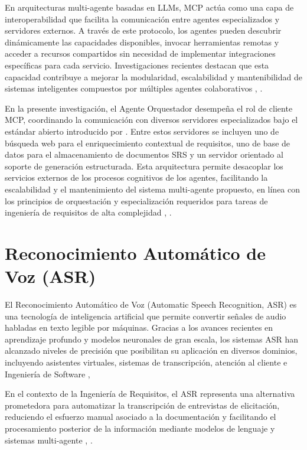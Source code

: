 En arquitecturas multi-agente basadas en LLMs, MCP actúa como una capa de interoperabilidad que facilita la comunicación entre agentes 
especializados y servidores externos. A través de este protocolo, los agentes pueden descubrir dinámicamente las capacidades disponibles, 
invocar herramientas remotas y acceder a recursos compartidos sin necesidad de implementar integraciones específicas para cada servicio. 
Investigaciones recientes destacan que esta capacidad contribuye a mejorar la modularidad, escalabilidad y mantenibilidad de sistemas inteligentes 
compuestos por múltiples agentes colaborativos \cite{hou2025model}, \cite{lumer2025scalemcp}.

En la presente investigación, el Agente Orquestador desempeña el rol de cliente MCP, coordinando la comunicación con diversos servidores 
especializados bajo el estándar abierto introducido por \cite{Anthropic2024}. Entre estos servidores se incluyen uno de búsqueda web para el 
enriquecimiento contextual de requisitos, uno de base de datos para el almacenamiento de documentos SRS y un servidor orientado al soporte de 
generación estructurada. Esta arquitectura permite desacoplar los servicios externos de los procesos cognitivos de los agentes, facilitando la 
escalabilidad y el mantenimiento del sistema multi-agente propuesto, en línea con los principios de orquestación y especialización requeridos para 
tareas de ingeniería de requisitos de alta complejidad \cite{Guo2024}, \cite{xi2025rise}.





\section{Reconocimiento Automático de Voz (ASR) }

El Reconocimiento Automático de Voz (Automatic Speech Recognition, ASR) es una tecnología de inteligencia artificial que permite convertir 
señales de audio habladas en texto legible por máquinas. Gracias a los avances recientes en aprendizaje profundo y modelos neuronales de gran 
escala, los sistemas ASR han alcanzado niveles de precisión que posibilitan su aplicación en diversos dominios, incluyendo asistentes virtuales, 
sistemas de transcripción, atención al cliente e Ingeniería de Software \cite{Li2020}, \cite{Radford2022}

En el contexto de la Ingeniería de Requisitos, el ASR representa una alternativa prometedora para automatizar la transcripción de entrevistas de 
elicitación, reduciendo el esfuerzo manual asociado a la documentación y facilitando el procesamiento posterior de la información mediante modelos 
de lenguaje y sistemas multi-agente \cite{Radford2022}, \cite{Umar2024}.

